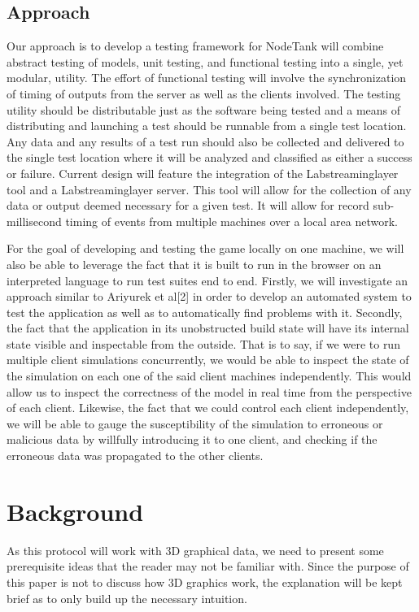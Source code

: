 \documentclass[conference]{IEEEtran}
\begin{document}
\subsection{Approach}
Our approach is to develop a testing framework for NodeTank will combine abstract testing of models, unit testing, and functional testing into a single, yet modular, 
utility. The effort of functional testing will involve the synchronization of timing of outputs from the server as well as the clients involved. The testing utility 
should be distributable just as the software being tested and a means of distributing and launching a test should be runnable from a single test location. Any data and 
any results of a test run should also be collected and delivered to the single test location where it will be analyzed and classified as either a success or failure. 
Current design will feature the integration of the Labstreaminglayer tool and a Labstreaminglayer server. This tool will allow for the collection of any data or output 
deemed necessary for a given test. It will allow for record sub-millisecond timing of events from multiple machines over a local area network.

For the goal of developing and testing the game locally on one machine, we will also be able to leverage the fact that it is built to run in the browser on
an interpreted language to run test suites end to end. Firstly, we will investigate an approach similar to Ariyurek et al[2] in order to develop an automated 
system to test the application as well as to automatically find problems with it. Secondly, the fact that the application in its unobstructed build state will have
its internal state visible and inspectable from the outside. That is to say, if we were to run multiple client simulations concurrently, we would be able to inspect 
the state of the simulation on each one of the said client machines independently. This would allow us to inspect the correctness of the model in real time from the 
perspective of each client. Likewise, the fact that we could control each client independently, we will be able to gauge the susceptibility of the simulation to erroneous 
or malicious data by willfully introducing it to one client, and checking if the erroneous data was propagated to the other clients.

\section{Background}

As this protocol will work with 3D graphical data, we need to present some prerequisite ideas that the reader may not be
familiar with. Since the purpose of this paper is not to discuss how 3D graphics work, the explanation will be kept brief 
as to only build up the necessary intuition. 
\end{document}
